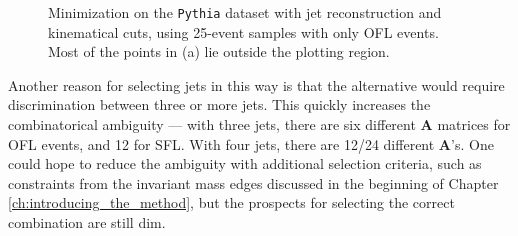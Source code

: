 \documentclass[twoside,english]{uiofysmaster}
\begin{document}
\begin{figure}[hbt]
\begin{subfigure}[b]{0.45\textwidth}
		\caption{ }
		\label{fig:event-pair-A-selection_pythia_4combosum-jetrec-OFL-25events_b} 
	\end{subfigure}
	\caption{Minimization on the {\tt Pythia} dataset with jet reconstruction and kinematical cuts, using 25-event samples with only OFL events. Most of the points in (a) lie outside the plotting region.}
	\label{fig:event-pair-A-selection_pythia_4combosum-jetrec-OFL-25events}
\end{figure}



Another reason for selecting jets in this way is that the alternative would require discrimination between three or more jets. This quickly increases the combinatorical ambiguity --- with three jets, there are six different $\mathbf{A}$ matrices for OFL events, and 12 for SFL. With four jets, there are 12/24 different $\mathbf{A}$'s. One could hope to reduce the ambiguity with additional selection criteria, such as constraints from the invariant mass edges discussed in the beginning of Chapter \ref{ch:introducing_the_method}, but the prospects for selecting the correct combination are still dim.
\end{document}
